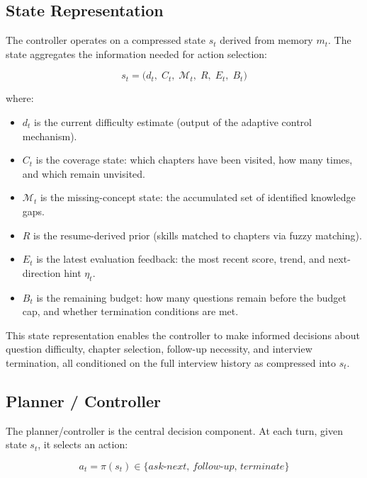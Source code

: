 ﻿\documentclass[final,3p,times,authoryear]{elsarticle}
\begin{document}
\subsection{State Representation}
\label{sec:state}

\noindent The controller operates on a compressed state $s_t$ derived from memory $m_t$. The state aggregates the information needed for action selection:

\begin{equation}
s_t = \bigl(d_t,\; C_t,\; \mathcal{M}_t,\; R,\; E_t,\; B_t\bigr)
\label{eq:state}
\end{equation}

where:
\begin{itemize}
    \item $d_t$ is the current difficulty estimate (output of the adaptive control mechanism).
    \item $C_t$ is the coverage state: which chapters have been visited, how many times, and which remain unvisited.
    \item $\mathcal{M}_t$ is the missing-concept state: the accumulated set of identified knowledge gaps.
    \item $R$ is the resume-derived prior (skills matched to chapters via fuzzy matching).
    \item $E_t$ is the latest evaluation feedback: the most recent score, trend, and next-direction hint $\eta_t$.
    \item $B_t$ is the remaining budget: how many questions remain before the budget cap, and whether termination conditions are met.
\end{itemize}

This state representation enables the controller to make informed decisions about question difficulty, chapter selection, follow-up necessity, and interview termination, all conditioned on the full interview history as compressed into $s_t$.

\subsection{Planner / Controller}
\label{sec:controller}

\noindent The planner/controller is the central decision component. At each turn, given state $s_t$, it selects an action:

\begin{equation}
a_t = \pi(s_t) \in \{\textit{ask-next},\, \textit{follow-up},\, \textit{terminate}\}
\end{equation}
\end{document}

